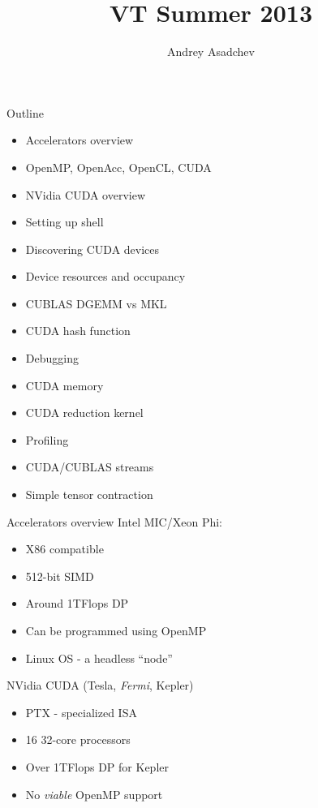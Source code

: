 \documentclass{beamer}
\title[VT Summer 2013]{VT Summer 2013}
\author{ Andrey Asadchev}
\institute{VT}
\begin{document}
\begin{frame}
\titlepage
\end{frame}


\begin{frame}{Outline}
\begin{itemize}
\item Accelerators overview
\item OpenMP, OpenAcc, OpenCL, CUDA
\item NVidia CUDA overview
\item Setting up shell
\item Discovering CUDA devices
\item Device resources and occupancy
\item CUBLAS DGEMM vs MKL
\item CUDA hash function
\item Debugging
\item CUDA memory
\item CUDA reduction kernel
\item Profiling
\item CUDA/CUBLAS streams
\item Simple tensor contraction
\end{itemize}
\end{frame}

\begin{frame}{Accelerators overview}
Intel MIC/Xeon Phi:
\begin{itemize}
\item X86 compatible
\item 512-bit SIMD
\item Around 1TFlops DP
\item Can be programmed using OpenMP
\item Linux OS - a headless ``node''
\end{itemize}
NVidia CUDA (Tesla, {\em Fermi}, Kepler)
\begin{itemize}
\item PTX - specialized ISA
\item 16 32-core processors
\item Over 1TFlops DP for Kepler
\item No {\it viable} OpenMP support
\end{itemize}
\end{frame}
\end{document}
